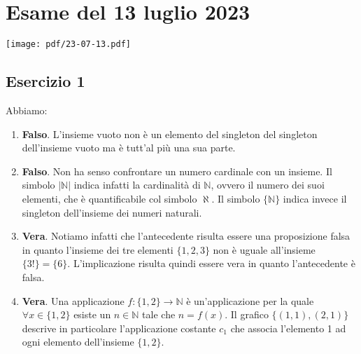 \section{Esame del 13 luglio 2023}
\begin{center}
	\texttt{[image: pdf/23-07-13.pdf]}
\end{center}
\subsection*{Esercizio 1}
Abbiamo:
\begin{enumerate}[label=(\textit{\roman*})]
	\item \textbf{Falso}. L'insieme vuoto non è un elemento del singleton del singleton dell'insieme vuoto ma è tutt'al più una sua parte.
	\item \textbf{Falso}. Non ha senso confrontare un numero cardinale con un insieme. Il simbolo $|\mathbb{N}|$ indica infatti la cardinalità di $\mathbb{N}$, ovvero il numero dei suoi elementi, che è quantificabile col simbolo $\aleph$. Il simbolo $\{\mathbb{N}\}$ indica invece il singleton dell'insieme dei numeri naturali.
	\item \textbf{Vera}. Notiamo infatti che l'antecedente risulta essere una proposizione falsa in quanto l'insieme dei tre elementi $\{1,2,3\}$ non è uguale all'insieme $\{3!\}=\{6\}$. L'implicazione risulta quindi essere vera in quanto l'antecedente è falsa.
	\item \textbf{Vera}. Una applicazione $f: \{1,2\} \rightarrow \mathbb{N}$ è un'applicazione per la quale $\forall x \in \{1,2\}$  esiste un $n \in \mathbb{N}$ tale che $n=f(x)$. Il grafico $\{(1,1),(2,1)\}$ descrive in particolare l'applicazione costante $c_{1}$ che associa l'elemento 1 ad ogni elemento dell'insieme $\{1,2\}$.
\end{enumerate}
